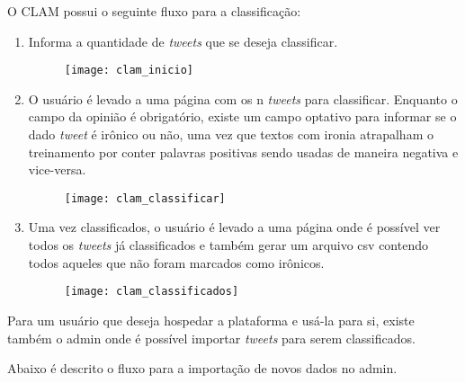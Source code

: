 O CLAM possui o seguinte fluxo para a classificação:

\begin{enumerate}
	\item Informa a quantidade de \textit{tweets} que se deseja classificar.
	\begin{figure}[H]
		\texttt{[image: clam\_inicio]}
	\end{figure}
	\item O usuário é levado a uma página com os n \textit{tweets} para classificar.
	Enquanto o campo da opinião é obrigatório, existe um campo optativo para informar
	se o dado \textit{tweet} é irônico ou não, uma vez que textos com ironia atrapalham
	o treinamento por conter palavras positivas sendo usadas de maneira negativa e vice-versa.
	\begin{figure}[H]
		\texttt{[image: clam\_classificar]}
	\end{figure}
	\item Uma vez classificados, o usuário é levado a uma página onde é possível ver todos
	os \textit{tweets} já classificados e também gerar um arquivo csv contendo todos aqueles
	que não foram marcados como irônicos.
	\begin{figure}[H]
		\texttt{[image: clam\_classificados]}
	\end{figure}
\end{enumerate}

Para um usuário que deseja hospedar a plataforma e usá-la para si, existe também o admin onde
é possível importar \textit{tweets} para serem classificados.

Abaixo é descrito o fluxo para a importação de novos dados no admin.

